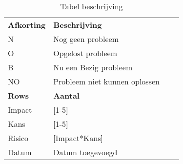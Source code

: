 \documentclass{article}
\begin{document}
\begin{sidewaystable}[h!]

\caption{Tabel beschrijving}
\label{tab: Tabel beschrijving}
\bigskip
\centering\small\setlength\tabcolsep{2pt}
\hspace*{-1cm}\begin{tabular}{l l l l }

\textbf{Afkorting} &\textbf{Beschrijving} \\
N	& Nog geen probleem \\
O	& Opgelost probleem \\
B	& Nu een Bezig probleem \\
NO	& Probleem niet kunnen oplossen \\
\textbf{Rows} &\textbf{Aantal} \\
Impact 	& [1-5] \\
Kans 	& [1-5] \\
Risico 	& [Impact*Kans] \\
Datum	& Datum toegevoegd \\

\end{tabular}\hspace*{-1cm}
\end{sidewaystable}
\end{document}
